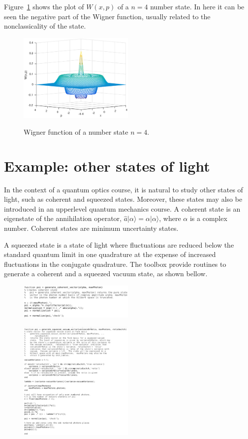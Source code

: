 \documentclass[twocolumn]{rbef}
\begin{document}
Figure~\ref{fig-W-number4} shows the plot of $W(x,p)$ of a $n=4$ number state. In here it can be seen the negative part of the Wigner function, usually related to the nonclassicality of the state.
\begin{figure}[h]
\includegraphics[width=0.5\textwidth]{fockn=4.eps}
\label{fig-W-number4}
\caption{Wigner function of a number state $n=4$.}
\end{figure}

\section{Example: other states of light}
\label{other-states}
In the context of a quantum optics course, it is natural to study other states of light, such as coherent and squeezed states. Moreover, these states may also be introduced in an upperlevel quantum mechanics course. A coherent state is an eigenstate of the annihilation operator, $\hat{a}|\alpha\rangle = \alpha |\alpha\rangle$, where $\alpha$ is a complex number. Coherent states are minimum uncertainty states.

A squeezed state is a state of light where fluctuations are reduced below the standard quantum limit in one quadrature at the expense of increased fluctuations in the conjugate quadrature. The toolbox provide routines to generate a coherent and a squeezed vacuum state, as shown bellow.
\begin{figure}[h]
\includegraphics[width=0.5\textwidth]{generate_coherent_vector.eps}
\end{figure}
 
\begin{figure}[h]
\includegraphics[width=0.5\textwidth]{generate_squeezed_vacuum_vector.eps}
\end{figure}
\end{document}
